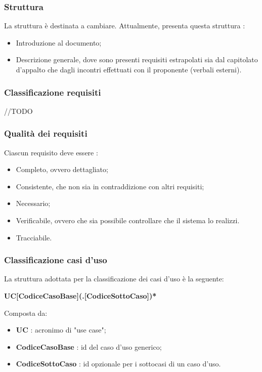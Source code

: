 \subsubsection{Struttura}
La struttura è destinata a cambiare.
Attualmente, \AdR presenta questa struttura :
\begin{itemize}
  \item Introduzione al documento;
  \item Descrizione generale, dove sono presenti requisiti estrapolati sia dal capitolato d’appalto che dagli incontri effettuati con il proponente (verbali esterni).
\end{itemize}

\subsubsection{Classificazione requisiti}
//TODO

\subsubsection{Qualità dei requisiti}
Ciascun requisito deve essere :
\begin{itemize}
  \item Completo, ovvero dettagliato;
  \item Consistente, che non sia in contraddizione con altri requisiti;
  \item Necessario;
  \item Verificabile, ovvero che sia possibile controllare che il sistema lo realizzi.
  \item Tracciabile.
\end{itemize}

\subsubsection{Classificazione casi d'uso}
La struttura adottata per la classificazione dei casi d'uso è la seguente: \\
\centerline{\textbf{UC[CodiceCasoBase](.[CodiceSottoCaso])*}}
Composta da:
\begin{itemize}
\item \textbf{UC} : acronimo di "use case";
\item \textbf{CodiceCasoBase} : id del caso d'uso generico;
\item \textbf{CodiceSottoCaso} : id opzionale per i sottocasi di un caso d'uso.
\end{itemize}

